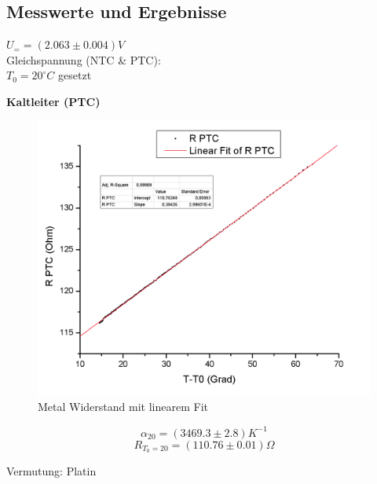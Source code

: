 \documentclass[12pt,a4paper]{article}
\begin{document}
\begin{multicols}{2}
\begin{itemize}
\end{itemize}



\pagebreak

\subsection{Messwerte und Ergebnisse}
$U_{=} = (2.063 \pm 0.004)V$\\
\indent Gleichspannung (NTC \& PTC):\\
$T_0 = 20^\circ C$ gesetzt\\








\end{multicols}
\noindent \textbf{Kaltleiter (PTC)}

\begin{figure}[H]
	\centering
	\includegraphics[scale=0.70]{./figure/RPTC_t_t0.png}
	\caption{Metal Widerstand mit linearem Fit}
	\label{fig:rptc}
\end{figure}

$$ \alpha_{20} = (3469.3 \pm  2.8    )K^{-1}$$
$$R_{T_0=20} = (110.76 \pm 0.01   )\Omega$$


Vermutung: Platin
\end{document}
